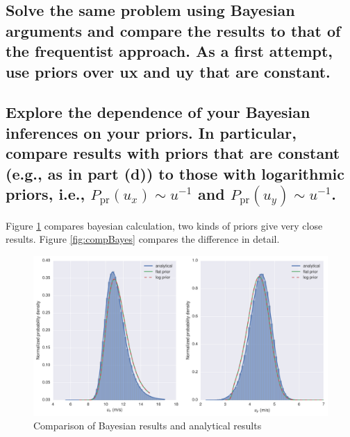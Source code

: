 \documentclass[paper=letter, fontsize=11pt]{scrartcl} %
\begin{document}
\subsection{Solve the same problem using Bayesian arguments and
  compare the results to that of the frequentist approach. As a first
  attempt, use priors over ux and uy that are constant.}

\subsection{Explore the dependence of your Bayesian inferences on your
  priors. In particular, compare results with priors that are
  constant (e.g., as in part (d)) to those with logarithmic priors,
  i.e., $P_{\mathrm{pr}}(u_{x}) \sim u^{-1}$ and
  $P_{\mathrm{pr}}(u_{y}) \sim u^{-1}$.}

Figure \ref{fig:Bayesian} compares bayesian calculation, two kinds of
priors give very close results. Figure \ref{fig:compBayes} compares
the difference in detail.

\begin{figure}[!ht]
  \centering
  \includegraphics[width=\textwidth]{MC_Bayesian}
  \caption{Comparison of Bayesian results and analytical results}
  \label{fig:Bayesian}
\end{figure}
\end{document}
